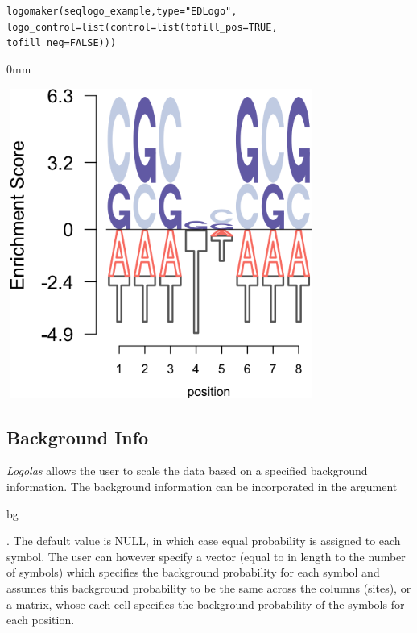 \documentclass[12pt]{article}\usepackage[]{graphicx}\usepackage[usenames,dvipsnames]{color}
\newcommand{\hlnum}[1]{\textcolor[rgb]{0.816,0.125,0.439}{#1}}%
\newcommand{\hlstr}[1]{\textcolor[rgb]{0.251,0.627,0.251}{#1}}%
\newcommand{\hlstd}[1]{\textcolor[rgb]{0.251,0.251,0.251}{#1}}%
\newcommand{\hlkwc}[1]{\textcolor[rgb]{0.251,0.251,0.251}{#1}}%
\newcommand{\hlkwd}[1]{\textcolor[rgb]{0.878,0.439,0.125}{#1}}%
\newenvironment{knitrout}{}{} %
\newcommand{\Logolas}{\textit{Logolas}}
\begin{document}
\begin{knitrout}
\color{fgcolor}\begin{kframe}
\begin{alltt}
\hlkwd{logomaker}\hlstd{(seqlogo_example,} \hlkwc{type} \hlstd{=} \hlstr{"EDLogo"}\hlstd{,}
          \hlkwc{logo_control} \hlstd{=} \hlkwd{list}\hlstd{(}\hlkwc{control} \hlstd{=} \hlkwd{list}\hlstd{(}\hlkwc{tofill_pos} \hlstd{=} \hlnum{TRUE}\hlstd{,}
                                             \hlkwc{tofill_neg} \hlstd{=} \hlnum{FALSE}\hlstd{)))}
\end{alltt}
\end{kframe}\begin{adjustwidth}{\fltoffset}{0mm}

\includegraphics[width=4in,height=4in]{figure/fill2-1} \hfill{}

\end{adjustwidth}
\end{knitrout}


\subsection{Background Info}

\Logolas{} allows the user to scale the data based on a specified background information. The background information can be incorporated in the argument \begin{verb} bg \end{verb}. The default value is NULL,
in which case equal probability is assigned to each symbol. The user can however specify a
vector (equal to in length to the number of symbols) which specifies the background probability
for each symbol and assumes this background probability to be the same across the columns (sites),
or a matrix, whose each cell specifies the background probability of the symbols for each position.
\end{document}
